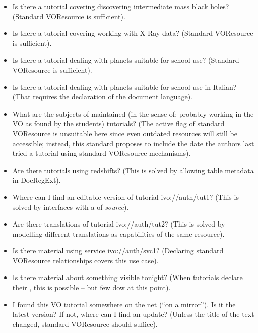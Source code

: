 \documentclass{ivoa}
\begin{document}
\begin{itemize}

\item Is there a tutorial covering discovering intermediate mass black
holes? (Standard VOResource is sufficient).

\item Is there a tutorial covering working with X-Ray data? (Standard
VOResource is sufficient).

\item Is there a tutorial dealing with planets suitable for school use?
(Standard VOResource is sufficient).

\item Is there a tutorial dealing with planets suitable for school use in
Italian? (That requires the declaration of the document language).

\item What are the subjects of maintained (in the sense of: probably
working in the VO as found by the students) tutorials?
(The active flag of standard VOResource is
unsuitable here since even outdated resources will still be accessible;
instead, this standard proposes to include the date the authors last
tried a tutorial using standard VOResource mechanisms).

\item Are there tutorials using redshifts? (This is solved by allowing
table metadata in DocRegExt).

\item Where can I find an editable version of tutorial ivo://auth/tut1?
(This is solved by interfaces with a  of \textit{source}).

\item Are there translations of tutorial ivo://auth/tut2? (This is
solved by modelling different translations as capabilities of the same
resource).

\item Is there material using service ivo://auth/svc1? (Declaring
standard VOResource relationships covers this use case).

\item Is there material about something visible tonight? (When tutorials
declare their , this is possible -- but few dow at this
point).

\item I found this VO tutorial somewhere on the net (``on a mirror'').  Is it
the latest version?  If not, where can I find an update? (Unless the
title of the text changed, standard VOResource should suffice).

\end{itemize}
\end{document}
